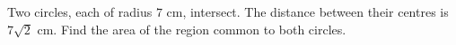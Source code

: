 Two circles, each of radius $7$ cm, intersect. The distance between their centres is $7\sqrt2$ cm. Find the area of the region common to both circles.
